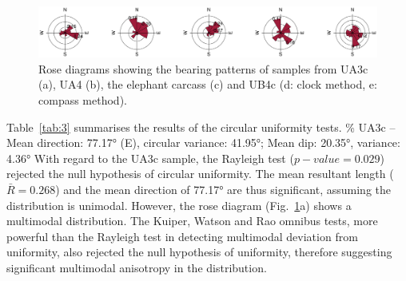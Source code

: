 \documentclass[preprint,authoryear,times]{elsarticle} %
\begin{document}
\begin{figure}[]
  \centering
  \includegraphics[width=1\textwidth]{../artwork/Fig6.eps}
  \caption{Rose diagrams showing the bearing patterns of samples from UA3c (a), UA4 (b), the elephant carcass (c) and UB4c (d: clock method, e: compass method).}
  \label{fig:6}
\end{figure}

\begin{table}[]
  \caption{Value and $p-value$ of circular uniformity test statistics.}
  \label{tab:3}
\end{table}

Table~\ref{tab:3} summarises the results of the circular uniformity tests.
\% UA3c -- Mean direction: 77.17° (E), circular variance: 41.95°; Mean dip: 20.35°, variance: 4.36°
With regard to the UA3c sample, the Rayleigh test ($p-value=0.029$) rejected the null hypothesis of circular uniformity. The mean resultant length ($\bar{R}=0.268$) and the mean direction of 77.17° are thus significant, assuming the distribution is unimodal. However, the rose diagram (Fig.~\ref{fig:6}a) shows a multimodal distribution. The Kuiper, Watson and Rao omnibus tests, more powerful than the Rayleigh test in detecting multimodal deviation from uniformity, also rejected the null hypothesis of uniformity, therefore suggesting significant multimodal anisotropy in the distribution.
\end{document}
